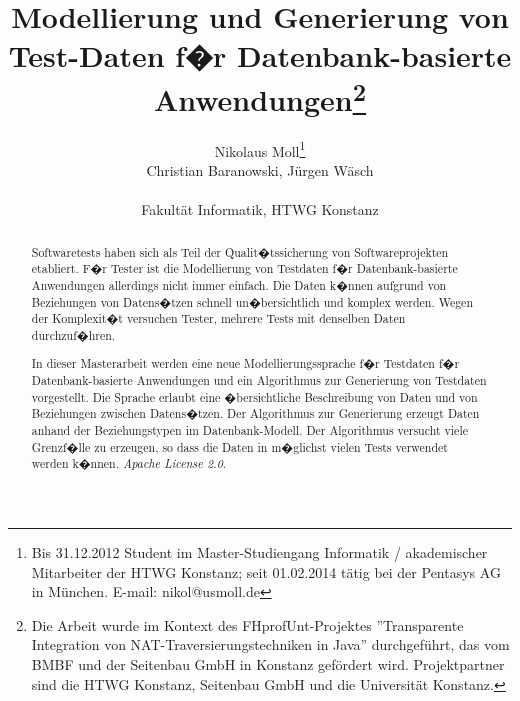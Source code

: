\documentclass{lni}
\author{
	Nikolaus Moll\footnote{Bis 31.12.2012 Student im Master-Studiengang Informatik / akademischer Mitarbeiter der HTWG Konstanz; seit 01.02.2014 t\"atig bei der Pentasys AG in München. E-mail: nikol@usmoll.de}\\ Christian Baranowski, J\"urgen W\"asch \\ 
	\\ 
	Fakult\"at Informatik,
	HTWG Konstanz \\ 
}
\title{Modellierung und Generierung von Test-Daten f�r Datenbank-basierte Anwendungen\footnote{Die Arbeit wurde im Kontext des FHprofUnt-Projektes ''Transparente Integration von NAT-Traversierungstechniken in Java'' durchgef\"uhrt, das vom BMBF und der Seitenbau GmbH in Konstanz gef\"ordert wird. Projektpartner sind die HTWG Konstanz, Seitenbau GmbH und die Universit\"at Konstanz.}}
\begin{document}
\maketitle




\begin{abstract}
Softwaretests haben sich als Teil der Qualit�tssicherung von Softwareprojekten etabliert.
F�r Tester ist die Modellierung von Testdaten f�r Datenbank-basierte Anwendungen allerdings
nicht immer einfach. Die Daten k�nnen aufgrund von Beziehungen von Datens�tzen schnell
un�bersichtlich und komplex werden. Wegen der Komplexit�t versuchen Tester, mehrere Tests
mit denselben Daten durchzuf�hren.

In dieser Masterarbeit werden eine neue Modellierungssprache f�r Testdaten f�r
Datenbank-basierte Anwendungen und ein Algorithmus zur Generierung von Testdaten 
vorgestellt. Die Sprache erlaubt eine �bersichtliche Beschreibung von Daten und
von Beziehungen zwischen Datens�tzen. Der Algorithmus zur Generierung erzeugt
Daten anhand der Beziehungstypen im Datenbank-Modell. Der Algorithmus versucht
viele Grenzf�lle zu erzeugen, so dass die Daten in m�glichst vielen Tests verwendet
werden k�nnen.
\textit{Apache License 2.0}.

\end{abstract}













\end{document}
